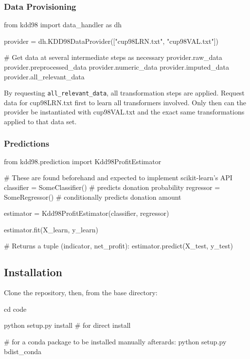 \documentclass[
  11pt,
  a4paper,
  DIV=12,captions=tableheading,oneside,titlepage]{scrbook}
\let\oldverbatim\verbatim
\let\endoldverbatim\endverbatim
\renewenvironment{verbatim}{\footnotesize\oldverbatim}{\endoldverbatim}
\begin{document}
\hypertarget{data-provisioning}{%
\subsubsection{Data Provisioning}\label{data-provisioning}}

\begin{verbatim}
from kdd98 import data_handler as dh

provider = dh.KDD98DataProvider(["cup98LRN.txt", "cup98VAL.txt"])

# Get data at several intermediate steps as necessary
provider.raw_data
provider.preprocessed_data
provider.numeric_data
provider.imputed_data
provider.all_relevant_data
\end{verbatim}

By requesting \texttt{all\_relevant\_data}, all transformation steps are applied. Request data for cup98LRN.txt first to learn all transformers involved. Only then can the provider be instantiated with cup98VAL.txt and the exact same transformations applied to that data set.

\hypertarget{predictions}{%
\subsubsection{Predictions}\label{predictions}}

\begin{verbatim}
from kdd98.prediction import Kdd98ProfitEstimator

# These are found beforehand and expected to implement scikit-learn's API
classifier = SomeClassifier() # predicts donation probability
regressor = SomeRegressor() # conditionally predicts donation amount

estimator = Kdd98ProfitEstimator(classifier, regressor)

estimator.fit(X_learn, y_learn)

# Returns a tuple (indicator, net_profit):
estimator.predict(X_test, y_test)
\end{verbatim}

\hypertarget{installation}{%
\subsection{Installation}\label{installation}}

Clone the repository, then, from the base directory:

\begin{verbatim}
cd code

python setup.py install # for direct install

# for a conda package to be installed manually afterards:
python setup.py bdist_conda 
\end{verbatim}
\end{document}
